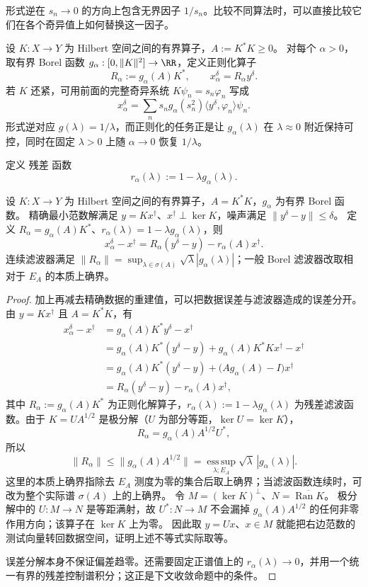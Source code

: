 \label{sec:inverse-spectral-filter}




形式逆在 $s_n\to0$ 的方向上包含无界因子 $1/s_n$。比较不同算法时，可以直接比较它们在各个奇异值上如何替换这一因子。

设 $K:X\to Y$ 为 Hilbert 空间之间的有界算子，$A:=K^*K\ge0$。
对每个 $\alpha>0$，取有界 Borel 函数 $g_\alpha:[0,\|K\|^2]\to\RR$，定义正则化算子
\[
{
R_\alpha
:=g_\alpha(A)K^*
},
\qquad
x_\alpha^\delta=R_\alpha y^\delta.
\]
若 $K$ 还紧，可用前面的完整奇异系统 $K\psi_n=s_n\varphi_n$ 写成
\[
x_\alpha^\delta
=\sum_n s_ng_\alpha(s_n^2)
\langle y^\delta,\varphi_n\rangle\psi_n.
\]
形式逆对应 $g(\lambda)=1/\lambda$，而正则化的任务正是让 $g_\alpha(\lambda)$ 在 $\lambda\approx0$ 附近保持可控，同时在固定 $\lambda>0$ 上随 $\alpha\to0$ 恢复 $1/\lambda$。

定义 残差 函数
\[
r_\alpha(\lambda)
:=1-\lambda g_\alpha(\lambda).
\]
\begin{proposition}[谱滤波误差的偏差与噪声分解]
设 $K:X\to Y$ 为 Hilbert 空间之间的有界算子，$A=K^*K$，$g_\alpha$ 为有界 Borel 函数。
精确最小范数解满足 $y=Kx^\dagger$、$x^\dagger\perp\ker K$，噪声满足 $\|y^\delta-y\|\le\delta$。
定义 $R_\alpha=g_\alpha(A)K^*$、$r_\alpha(\lambda)=1-\lambda g_\alpha(\lambda)$，则
\[
x_\alpha^\delta-x^\dagger=R_\alpha(y^\delta-y)-r_\alpha(A)x^\dagger.
\]
连续滤波器满足 $\|R_\alpha\|=\sup_{\lambda\in\sigma(A)}\sqrt\lambda|g_\alpha(\lambda)|$；一般 Borel 滤波器改取相对于 $E_A$ 的本质上确界。
\end{proposition}
\begin{proof}
加上再减去精确数据的重建值，可以把数据误差与滤波器造成的误差分开。由 $y=Kx^\dagger$ 且 $A=K^*K$，有
\[
\begin{aligned}
x_\alpha^\delta-x^\dagger
&=g_\alpha(A)K^*y^\delta-x^\dagger\\
&=g_\alpha(A)K^*(y^\delta-y)
+g_\alpha(A)K^*Kx^\dagger-x^\dagger\\
&=g_\alpha(A)K^*(y^\delta-y)
+\bigl(A g_\alpha(A)-I\bigr)x^\dagger\\
&=R_\alpha(y^\delta-y)
-r_\alpha(A)x^\dagger,
\end{aligned}
\]
其中 $R_\alpha:=g_\alpha(A)K^*$ 为正则化解算子，$r_\alpha(\lambda):=1-\lambda g_\alpha(\lambda)$ 为残差滤波函数。由于 $K=U A^{1/2}$ 是极分解（$U$ 为部分等距，$\ker U=\ker K$），
\[
R_\alpha
=g_\alpha(A)A^{1/2}U^*,
\]
所以
\[
\|R_\alpha\|
\le
\|g_\alpha(A)A^{1/2}\|
=
\operatorname*{ess\,sup}_{\lambda;E_A}
\sqrt\lambda\,|g_\alpha(\lambda)|.
\]
这里的本质上确界指除去 $E_A$ 测度为零的集合后取上确界；当滤波函数连续时，可改为整个实际谱 $\sigma(A)$ 上的上确界。
令 $M=(\ker K)^\perp$、$N=\overline{\operatorname{Ran}K}$。
极分解中的 $U:M\to N$ 是等距满射，故 $U^*:N\to M$ 不会漏掉 $g_\alpha(A)A^{1/2}$ 的任何非零作用方向；该算子在 $\ker K$ 上为零。
因此取 $y=Ux$、$x\in M$ 就能把右边范数的测试向量转回数据空间，证明上述不等式实际取等。

误差分解本身不保证偏差趋零。还需要固定正谱值上的 $r_\alpha(\lambda)\to0$，并用一个统一有界的残差控制谱积分；这正是下文收敛命题中的条件。
\end{proof}

